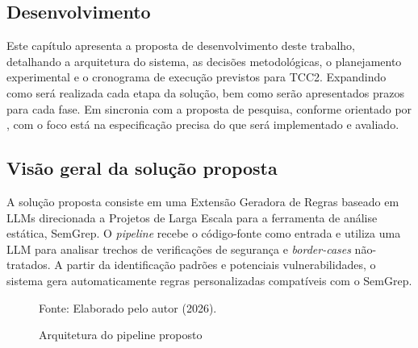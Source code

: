 \documentclass[
    12pt,                %
    openright,           %
    oneside,             %
    a4paper,             %
    english,             %
    brazil               %
]{abntex2}
\begin{document}
\begin{itemize}
\chapter{Desenvolvimento}
\label{cap:desenvolvimento}
\par
Este capítulo apresenta a proposta de desenvolvimento deste trabalho, detalhando a arquitetura do sistema, as decisões metodológicas, o planejamento experimental e o cronograma de execução previstos para TCC2. 
Expandindo como será realizada cada etapa da solução, bem como serão apresentados prazos para cada fase.
Em sincronia com a proposta de pesquisa, conforme orientado por , com o foco está na especificação precisa do que será implementado e avaliado.

\section{Visão geral da solução proposta}
\label{sec:solucao}
\par
A solução proposta consiste em uma Extensão Geradora de Regras baseado em LLMs direcionada a Projetos de Larga Escala para a ferramenta de análise estática, SemGrep.
O \textit{pipeline} recebe o código-fonte como entrada e utiliza uma LLM para analisar trechos de verificações de segurança e \textit{border-cases} não-tratados. A partir da identificação padrões e potenciais vulnerabilidades, o sistema gera automaticamente regras personalizadas compatíveis com o SemGrep.

\begin{figure}[htbp]
    \centering
    \caption{Arquitetura do pipeline proposto}
    \label{fig:pipetable}
    \vspace{0.5em}
    \footnotesize Fonte: Elaborado pelo autor (2026).
\end{figure}


\end{itemize}
\end{document}
